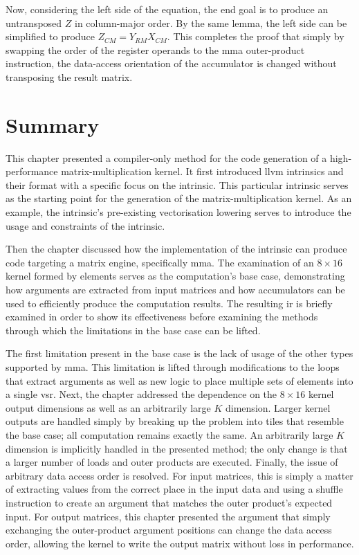 \documentclass[\main/thesis.tex]{subfiles}
\begin{document}
Now, considering the left side of the equation, the end goal is to produce an untransposed $Z$ in column-major order.
By the same lemma, the left side can be simplified to produce $Z_{CM} = Y_{RM}X_{CM}$.
This completes the proof that simply by swapping the order of the register operands to the \gls{mma} outer-product instruction, the data-access orientation of the accumulator is changed without transposing the result matrix.

\section{Summary}
This chapter presented a compiler-only method for the code generation of a high-performance matrix-multiplication kernel.
It first introduced \gls{llvm} intrinsics and their format with a specific focus on the  intrinsic.
This particular intrinsic serves as the starting point for the generation of the matrix-multiplication kernel.
As an example, the intrinsic's pre-existing vectorisation lowering serves to introduce the usage and constraints of the intrinsic.

Then the chapter discussed how the implementation of the intrinsic can produce code targeting a \gls{matrix engine}, specifically \gls{mma}.
The examination of an $8 \times 16$ kernel formed by  elements serves as the computation's base case, demonstrating how arguments are extracted from input matrices and how accumulators can be used to efficiently produce the computation results.
The resulting \gls{ir} is briefly examined in order to show its effectiveness before examining the methods through which the limitations in the base case can be lifted.

The first limitation present in the base case is the lack of usage of the other types supported by \gls{mma}.
This limitation is lifted through modifications to the loops that extract arguments as well as new logic to place multiple sets of elements into a single \gls{vsr}.
Next, the chapter addressed the dependence on the $8 \times 16$ kernel output dimensions as well as an arbitrarily large $K$ dimension.
Larger kernel outputs are handled simply by breaking up the problem into tiles that resemble the base case; all computation remains exactly the same.
An arbitrarily large $K$ dimension is implicitly handled in the presented method; the only change is that a larger number of loads and outer products are executed.
Finally, the issue of arbitrary data access order is resolved.
For input matrices, this is simply a matter of extracting values from the correct place in the input data and using a shuffle instruction to create an argument that matches the outer product's expected input.
For output matrices, this chapter presented the argument that simply exchanging the outer-product argument positions can change the data access order, allowing the kernel to write the output matrix without loss in performance.
\end{document}
